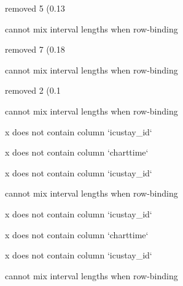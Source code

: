 \documentclass[
]{jss}
\begin{document}
\begin{CodeChunk}
\begin{CodeOutput}
removed 5 (0.13%
\end{CodeOutput}

\begin{CodeOutput}
cannot mix interval lengths when row-binding
\end{CodeOutput}

\begin{CodeOutput}
removed 7 (0.18%
\end{CodeOutput}

\begin{CodeOutput}
cannot mix interval lengths when row-binding
\end{CodeOutput}

\begin{CodeOutput}
removed 2 (0.1%
\end{CodeOutput}

\begin{CodeOutput}
cannot mix interval lengths when row-binding
\end{CodeOutput}

\begin{CodeOutput}
x does not contain column `icustay_id`
\end{CodeOutput}

\begin{CodeOutput}
x does not contain column `charttime`
\end{CodeOutput}

\begin{CodeOutput}
x does not contain column `icustay_id`
\end{CodeOutput}

\begin{CodeOutput}
cannot mix interval lengths when row-binding
\end{CodeOutput}

\begin{CodeOutput}
x does not contain column `icustay_id`
\end{CodeOutput}

\begin{CodeOutput}
x does not contain column `charttime`
\end{CodeOutput}

\begin{CodeOutput}
x does not contain column `icustay_id`
\end{CodeOutput}

\begin{CodeOutput}
cannot mix interval lengths when row-binding
\end{CodeOutput}


\end{CodeChunk}
\end{document}
